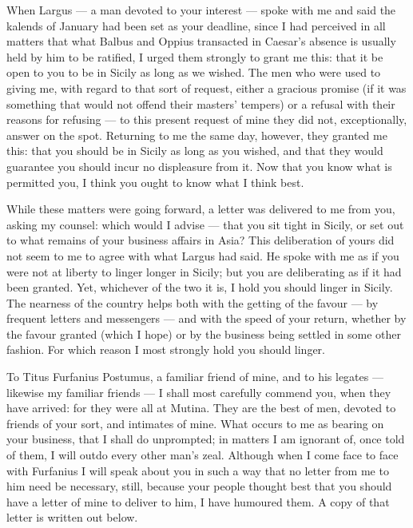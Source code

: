 

 When Largus --- a man devoted to your interest --- spoke with me and said the kalends of January had been set as your deadline, since I had perceived in all matters that what Balbus and Oppius transacted in Caesar's absence is usually held by him to be ratified, I urged them strongly to grant me this: that it be open to you to be in Sicily as long as we wished. The men who were used to giving me, with regard to that sort of request, either a gracious promise (if it was something that would not offend their masters' tempers) or a refusal with their reasons for refusing --- to this present request of mine they did not, exceptionally, answer on the spot. Returning to me the same day, however, they granted me this: that you should be in Sicily as long as you wished, and that they would guarantee you should incur no displeasure from it. Now that you know what is permitted you, I think you ought to know what I think best.

 While these matters were going forward, a letter was delivered to me from you, asking my counsel: which would I advise --- that you sit tight in Sicily, or set out to what remains of your business affairs in Asia? This deliberation of yours did not seem to me to agree with what Largus had said. He spoke with me as if you were not at liberty to linger longer in Sicily; but you are deliberating as if it had been granted. Yet, whichever of the two it is, I hold you should linger in Sicily. The nearness of the country helps both with the getting of the favour --- by frequent letters and messengers --- and with the speed of your return, whether by the favour granted (which I hope) or by the business being settled in some other fashion. For which reason I most strongly hold you should linger.

 To Titus Furfanius Postumus, a familiar friend of mine, and to his legates --- likewise my familiar friends --- I shall most carefully commend you, when they have arrived: for they were all at Mutina. They are the best of men, devoted to friends of your sort, and intimates of mine. What occurs to me as bearing on your business, that I shall do unprompted; in matters I am ignorant of, once told of them, I will outdo every other man's zeal. Although when I come face to face with Furfanius I will speak about you in such a way that no letter from me to him need be necessary, still, because your people thought best that you should have a letter of mine to deliver to him, I have humoured them. A copy of that letter is written out below.
